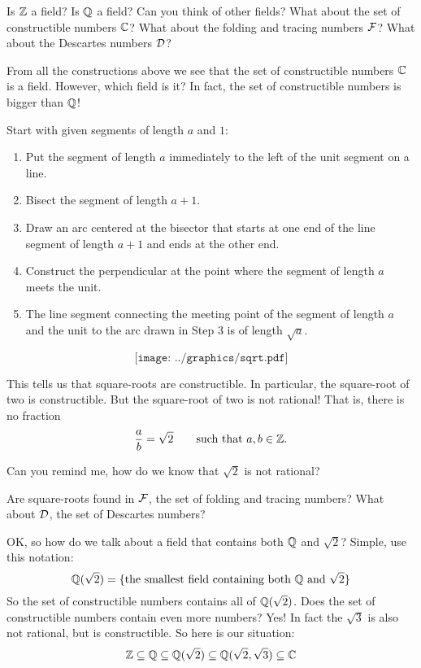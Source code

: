 \begin{question} Is $\mathbb Z$ a field?  Is $\mathbb Q$ a field?  Can you think of other fields?  What about the set of constructible numbers $\mathbb C$? What about the folding and tracing numbers $\mathcal F$? What about the Descartes numbers $\mathcal D$?
\end{question}
\QM

From all the constructions above we see that the set of constructible
numbers $\mathbb C$ is a field. However, which field is it? In fact, the set
of constructible numbers is bigger than $\mathbb Q$!

\begin{construction} Start with given segments of length $a$ and $1$:
\begin{enumerate}
\item  Put the segment of length $a$ immediately to the left of 
the unit segment on a line. 
\item Bisect the segment of length $a + 1$.
\item Draw an arc centered at the bisector that starts at one 
end of the line segment of length $a + 1$ and ends at the other end. 
\item Construct the perpendicular at the point where the segment of length $a$ meets the unit. 
\item The line segment connecting the meeting point of the segment of length $a$ and the unit to the arc drawn in Step $3$ is of length $\sqrt{a}$. 
\end{enumerate}
\[
\texttt{[image: ../graphics/sqrt.pdf]}
\]
\end{construction}

This tells us that square-roots are constructible. In particular, the square-root of two is constructible. But the square-root of two is not rational! That is, there is no fraction
\[
\frac{a}{b} = \sqrt{2} \qquad \text{such that $a,b\in\mathbb Z$}.
\]

\begin{question} 
Can you remind me, how do we know that $\sqrt{2}$ is not rational?
\end{question}
\QM

\begin{question} 
Are square-roots found in $\mathcal F$, the set of folding and tracing numbers? What about
$\mathcal D$, the set of Descartes numbers?
\end{question}
\QM

OK, so how do we talk about a field that contains both $\mathbb Q$ and
$\sqrt{2}$? Simple, use this notation:
\[
\mathbb Q(\sqrt{2})= \{\text{the smallest field containing both $\mathbb Q$ and $\sqrt{2}$}\}
\]
So the set of constructible numbers contains all of $\mathbb Q( \sqrt{2} )$. Does the set of constructible numbers contain even more numbers? Yes! In fact the $\sqrt{3}$ is also not rational, but is constructible. So here is our situation:
\[
\mathbb Z \subseteq \mathbb Q \subseteq \mathbb Q(\sqrt{2}) \subseteq \mathbb Q(\sqrt{2},\sqrt{3}) \subseteq \mathbb C
\]

